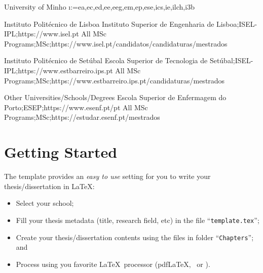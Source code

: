 \begin{ntUniversity}{University of Minho}
  \ntfor\i:={ea,ec,ed,ee,eeg,em,ep,ese,ics,ie,ilch,i3b}%
\end{ntUniversity}


\begin{ntUniversity}{Instituto Politécnico de Lisboa}
             {{Instituto Superior de Engenharia de Lisboa};{ISEL-IPL};{https://www.isel.pt}}
             {{All MSc Programs};{MSc};{https://www.isel.pt/candidatos/candidaturas/mestrados}}
\end{ntUniversity}

\begin{ntUniversity}{Instituto Politécnico de Setúbal}
             {{Escola Superior de Tecnologia de Setúbal};{ISEL-IPL};{https://www.estbarreiro.ips.pt}}
             {{All MSc Programs};{MSc};{https://www.estbarreiro.ips.pt/candidaturas/mestrados}}
\end{ntUniversity}

\begin{ntUniversity}{Other Universities/Schools/Degrees}
             {{Escola Superior de Enfermagem do Porto};{ESEP};{https://www.esenf.pt/pt}}
             {{All MSc Programs};{MSc};{https://estudar.esenf.pt/mestrados}}
\end{ntUniversity}


\section{Getting Started}
\label{sec:getting_started}

The template provides an \emph{easy to use} setting for you to write your thesis/dissertation in \LaTeX:
\begin{itemize}
  \item  Select your school;
  \item Fill your thesis metadata (title, research field, etc) in the file “\texttt{template.tex}”;
  \item Create your thesis/dissertation contents using the files in folder “\texttt{Chapters}”; and
  \item Process using you favorite \LaTeX\ processor (pdf\LaTeX, \XeLaTeX\ or \LuaLaTeX).
\end{itemize}

